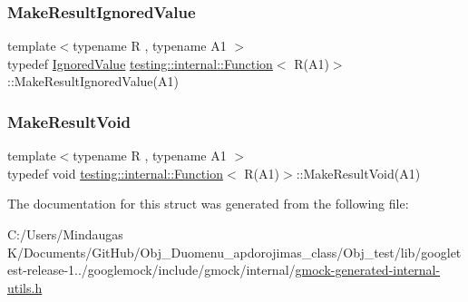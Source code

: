 \subsubsection{\texorpdfstring{MakeResultIgnoredValue}{MakeResultIgnoredValue}}
{\footnotesize\ttfamily template$<$typename R , typename A1 $>$ \\
typedef \mbox{\hyperlink{classtesting_1_1internal_1_1_ignored_value}{Ignored\+Value}} \mbox{\hyperlink{structtesting_1_1internal_1_1_function}{testing\+::internal\+::\+Function}}$<$ R(A1)$>$\+::Make\+Result\+Ignored\+Value(A1)}

\mbox{\label{structtesting_1_1internal_1_1_function_3_01_r_07_a1_08_4_aab10495172953eb51fc3940c4c1e890a}} 
\subsubsection{\texorpdfstring{MakeResultVoid}{MakeResultVoid}}
{\footnotesize\ttfamily template$<$typename R , typename A1 $>$ \\
typedef void \mbox{\hyperlink{structtesting_1_1internal_1_1_function}{testing\+::internal\+::\+Function}}$<$ R(A1)$>$\+::Make\+Result\+Void(A1)}



The documentation for this struct was generated from the following file\+:\begin{DoxyCompactItemize}
\item 
C\+:/\+Users/\+Mindaugas K/\+Documents/\+Git\+Hub/\+Obj\+\_\+\+Duomenu\+\_\+apdorojimas\+\_\+class/\+Obj\+\_\+test/lib/googletest-\/release-\/1../googlemock/include/gmock/internal/\mbox{\hyperlink{gmock-generated-internal-utils_8h}{gmock-\/generated-\/internal-\/utils.\+h}}\end{DoxyCompactItemize}
